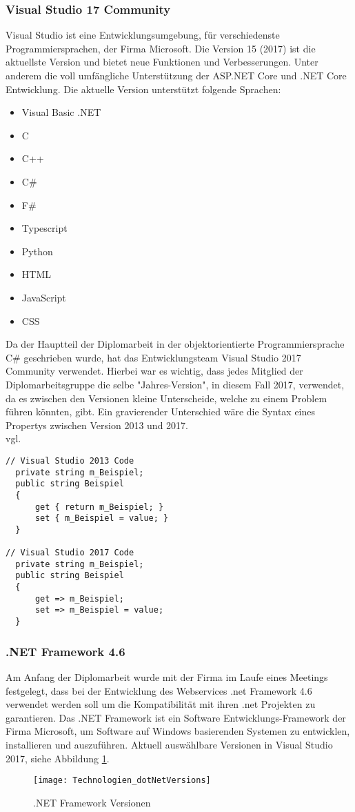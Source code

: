 \subsubsection{Visual Studio 17 Community}
\label{sec:VisualStudio17Community}
Visual Studio ist eine Entwicklungsumgebung, für verschiedenste Programmiersprachen, der Firma Microsoft. Die Version 15 (2017) ist die aktuellste Version und bietet neue Funktionen und Verbesserungen. Unter anderem die voll umfängliche Unterstützung der ASP.NET Core und .NET Core Entwicklung. Die aktuelle Version unterstützt folgende Sprachen:
\begin{itemize}
\item Visual Basic .NET
\item C
\item C++
\item C\#
\item F\#
\item Typescript
\item Python
\item HTML
\item JavaScript
\item CSS
\end{itemize}
Da der Hauptteil der Diplomarbeit in der objektorientierte Programmiersprache C\# geschrieben wurde, hat das Entwicklungsteam Visual Studio 2017 Community verwendet. Hierbei war es wichtig, dass jedes Mitglied der Diplomarbeitsgruppe die selbe "Jahres-Version", in diesem Fall 2017, verwendet, da es zwischen den Versionen kleine Unterscheide, welche zu einem Problem führen könnten, gibt. Ein gravierender Unterschied wäre die Syntax eines Propertys zwischen Version 2013 und 2017. \\vgl. \textcite{visualstudio}
\begin{lstlisting}[caption=Syntax Unterschied: Property , label=lst:test]
// Visual Studio 2013 Code
  private string m_Beispiel;
  public string Beispiel
  {
      get { return m_Beispiel; }
      set { m_Beispiel = value; }
  }

// Visual Studio 2017 Code
  private string m_Beispiel;
  public string Beispiel
  {
      get => m_Beispiel;
      set => m_Beispiel = value;
  }
\end{lstlisting}

\subsubsection{.NET Framework 4.6}
\label{sec:.NETFramework4.6}
Am Anfang der Diplomarbeit wurde mit der Firma im Laufe eines Meetings festgelegt, dass bei der Entwicklung des Webservices .net Framework 4.6 verwendet werden soll um die Kompatibilität mit ihren .net Projekten zu garantieren.
Das .NET Framework ist ein Software Entwicklungs-Framework der Firma Microsoft, um Software auf Windows basierenden Systemen zu entwicklen, installieren und auszuführen. 
Aktuell auswählbare Versionen in Visual Studio 2017, siehe Abbildung \ref{fig:netFramework}.\\ 
\begin{figure}[H]
	\centering
    \texttt{[image: Technologien\_dotNetVersions]}
    \caption{.NET Framework Versionen}
    \label{fig:netFramework}
\end{figure}
\justifying
